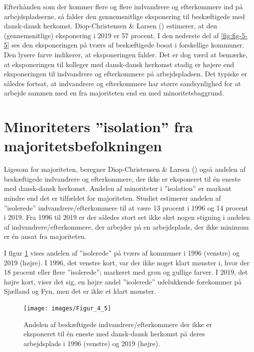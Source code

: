 \documentclass[
]{book}
\begin{document}
Efterhånden som der kommer flere og flere indvandrere og efterkommere ind på arbejdspladserne, så falder den gennemsnitlige eksponering til beskæftigede med dansk-dansk herkomst. Diop-Christensen \& Larsen () estimerer, at den (gennemsnitlige) eksponering i 2019 er 57 procent. I den nederste del af \ref{fig:fig-5-5} ses den eksponeringen på tværs af beskæftigede bosat i forskellige kommuner. Den lysere farve indikerer, at eksponeringen falder. Det er dog værd at bemærke, at eksponeringen til kolleger med dansk-dansk herkomst stadig er højere end eksponeringen til indvandrere og efterkommere på arbejdspladsen. Det typiske er således fortsat, at indvandrere og efterkommere har større sandsynlighed for at arbejde sammen med en fra majoriteten end en med minoritetsbaggrund.

\section{Minoriteters ''isolation'' fra majoritetsbefolkningen}\label{minoriteters-isolation-fra-majoritetsbefolkningen}

Ligesom for majoriteten, beregner Diop-Christensen \& Larsen () også andelen af beskæftigede indvandrere og efterkommere, der ikke er eksponeret til én eneste med dansk-dansk herkomst. Andelen af minoriteter i ''isolation'' er markant mindre end det er tilfældet for majoriteten. Studiet estimerer andelen af ''isolerede'' indvandrere/efterkommere til at være 13 procent i 1996 og 14 procent i 2019. Fra 1996 til 2019 er der således stort set ikke sket nogen stigning i andelen af indvandrere/efterkommere, der arbejder på en arbejdsplads, der ikke minimum er én ansat fra majoriteten.

I figur \ref{fig:fig-5-6} vises andelen af ''isolerede'' på tværs af kommuner i 1996 (venstre) og 2019 (højre). I 1996, det venstre kort, var der ikke noget klart mønster i, hvor der 18 procent eller flere ''isolerede''; markeret med grøn og gullige farver. I 2019, det højre kort, viser det sig, en højre andel ''isolerede'' udelukkende forekommer på Sjælland og Fyn, men det er ikke et klart mønster.

\newpage

\begin{figure}
\texttt{[image: images/Figur\_4\_5]} \caption{Andelen af beskæftigede indvandrere/efterkommere der ikke er eksponeret til én eneste med dansk-dansk herkomst på deres arbejdsplads i 1996 (venstre) og 2019 (højre).}\label{fig:fig-5-6}
\end{figure}
\end{document}
